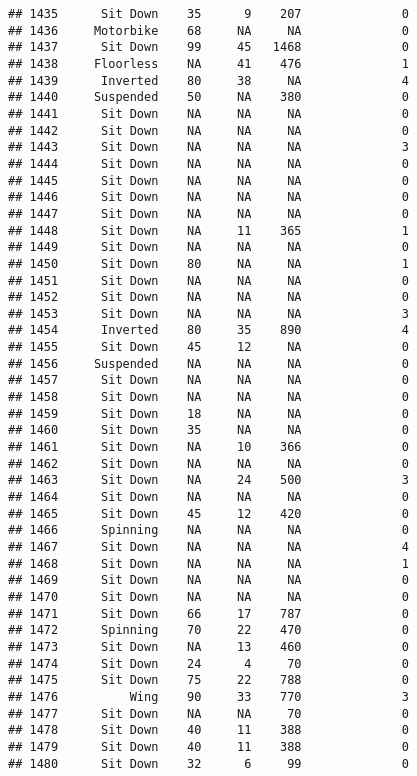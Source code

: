 \documentclass[
]{article}
\begin{document}
\begin{verbatim}
## 1435      Sit Down    35      9    207              0
## 1436     Motorbike    68     NA     NA              0
## 1437      Sit Down    99     45   1468              0
## 1438     Floorless    NA     41    476              1
## 1439      Inverted    80     38     NA              4
## 1440     Suspended    50     NA    380              0
## 1441      Sit Down    NA     NA     NA              0
## 1442      Sit Down    NA     NA     NA              0
## 1443      Sit Down    NA     NA     NA              3
## 1444      Sit Down    NA     NA     NA              0
## 1445      Sit Down    NA     NA     NA              0
## 1446      Sit Down    NA     NA     NA              0
## 1447      Sit Down    NA     NA     NA              0
## 1448      Sit Down    NA     11    365              1
## 1449      Sit Down    NA     NA     NA              0
## 1450      Sit Down    80     NA     NA              1
## 1451      Sit Down    NA     NA     NA              0
## 1452      Sit Down    NA     NA     NA              0
## 1453      Sit Down    NA     NA     NA              3
## 1454      Inverted    80     35    890              4
## 1455      Sit Down    45     12     NA              0
## 1456     Suspended    NA     NA     NA              0
## 1457      Sit Down    NA     NA     NA              0
## 1458      Sit Down    NA     NA     NA              0
## 1459      Sit Down    18     NA     NA              0
## 1460      Sit Down    35     NA     NA              0
## 1461      Sit Down    NA     10    366              0
## 1462      Sit Down    NA     NA     NA              0
## 1463      Sit Down    NA     24    500              3
## 1464      Sit Down    NA     NA     NA              0
## 1465      Sit Down    45     12    420              0
## 1466      Spinning    NA     NA     NA              0
## 1467      Sit Down    NA     NA     NA              4
## 1468      Sit Down    NA     NA     NA              1
## 1469      Sit Down    NA     NA     NA              0
## 1470      Sit Down    NA     NA     NA              0
## 1471      Sit Down    66     17    787              0
## 1472      Spinning    70     22    470              0
## 1473      Sit Down    NA     13    460              0
## 1474      Sit Down    24      4     70              0
## 1475      Sit Down    75     22    788              0
## 1476          Wing    90     33    770              3
## 1477      Sit Down    NA     NA     70              0
## 1478      Sit Down    40     11    388              0
## 1479      Sit Down    40     11    388              0
## 1480      Sit Down    32      6     99              0

\end{verbatim}
\end{document}
